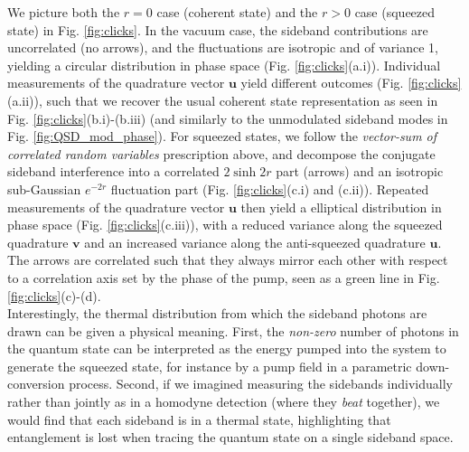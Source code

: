 We picture both the $r=0$ case (coherent state) and the $r>0$ case (squeezed state) in Fig. \ref{fig:clicks}. In the vacuum case, the sideband contributions are uncorrelated (no arrows), and the fluctuations are isotropic and of variance 1, yielding a circular distribution in phase space (Fig. \ref{fig:clicks}(a.i)). Individual measurements of the quadrature vector $\mathbf{u}$ yield different outcomes (Fig. \ref{fig:clicks}(a.ii)), such that we recover the usual coherent state representation as seen in Fig. \ref{fig:clicks}(b.i)-(b.iii) (and similarly to the unmodulated sideband modes in Fig. \ref{fig:QSD_mod_phase}). For squeezed states, we follow the \textit{vector-sum of correlated random variables} prescription above, and decompose the conjugate sideband interference into a correlated $2\sinh 2r$ part (arrows) and an isotropic sub-Gaussian $e^{-2r}$ fluctuation part (Fig. \ref{fig:clicks}(c.i) and (c.ii)). Repeated measurements of the quadrature vector $\mathbf{u}$ then yield a elliptical distribution in phase space (Fig. \ref{fig:clicks}(c.iii)), with a reduced variance along the squeezed quadrature $\mathbf v$ and an increased variance along the anti-squeezed quadrature $\mathbf u$. The arrows are correlated such that they always mirror each other with respect to a correlation axis set by the phase of the pump, seen as a green line in Fig. \ref{fig:clicks}(c)-(d). \\ 



Interestingly, the thermal distribution from which the sideband photons are drawn can be given a physical meaning. First, the \textit{non-zero} number of photons in the quantum state can be interpreted as the energy pumped into the system to generate the squeezed state, for instance by a pump field in a parametric down-conversion process. Second, if we imagined measuring the sidebands individually rather than jointly as in a homodyne detection (where they \textit{beat} together), we would find that each sideband is in a thermal state, highlighting that entanglement is lost when tracing the quantum state on a single sideband space. 








\newpage 


